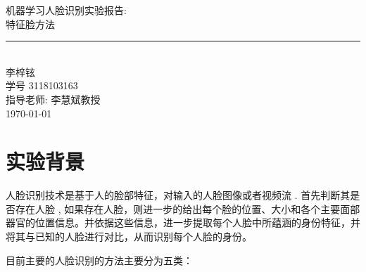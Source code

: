 \documentclass[UTF8]{ctexart}
\newcommand{\labtitle}{特征脸方法}
\newcommand{\authorname}{李梓铉}
\newcommand{\professor}{李慧斌教授}
\newcommand{\classno}{3118103163}
\begin{document}


\begin{titlepage}
\begin{center}
{\LARGE \textsc{机器学习人脸识别实验报告:} \\ \vspace{4pt}}
{\Large \textsc{\labtitle} \\ \vspace{4pt}}
\rule[13pt]{\textwidth}{1pt} \\ \vspace{150pt}
{\large  \authorname \\ \vspace{10pt}
学号 \classno\\ \vspace{10pt}
指导老师: \professor \\ \vspace{10pt}
\today}
\end{center}
\end{titlepage}


\newpage
\tableofcontents



\newpage
\section{实验背景}

人脸识别技术是基于人的脸部特征，对输入的人脸图像或者视频流 . 首先判断其是否存在人脸 , 如果存在人脸，则进一步的给出每个脸的位置、大小和各个主要面部器官的位置信息。并依据这些信息，进一步提取每个人脸中所蕴涵的身份特征，并将其与已知的人脸进行对比，从而识别每个人脸的身份。\vspace{3mm}

目前主要的人脸识别的方法主要分为五类：\vspace{3mm}
\end{document}

